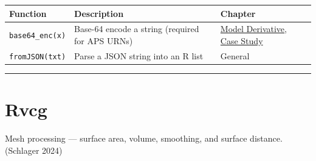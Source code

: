 \documentclass[
  11pt,
  letterpaper,
  DIV=11,
  numbers=noendperiod]{scrreprt}
\begin{document}
\begin{longtable}[]{@{}
  >{\raggedright\arraybackslash}p{}
  >{\raggedright\arraybackslash}p{}
  >{\raggedright\arraybackslash}p{}@{}}
\toprule\noalign{}
\begin{minipage}[b]{\linewidth}\raggedright
Function
\end{minipage} & \begin{minipage}[b]{\linewidth}\raggedright
Description
\end{minipage} & \begin{minipage}[b]{\linewidth}\raggedright
Chapter
\end{minipage} \\
\midrule\noalign{}
\endhead
\bottomrule\noalign{}
\endlastfoot
\texttt{base64\_enc(x)} & Base-64 encode a string (required for APS
URNs) & \hyperref[model-derivative]{Model Derivative},
\hyperref[case-study-dwg-to-shiny-dashboard]{Case Study} \\
\texttt{fromJSON(txt)} & Parse a JSON string into an R list & General \\
\end{longtable}

\begin{center}\rule{0.5\linewidth}{0.5pt}\end{center}

\section{Rvcg}\label{rvcg}

Mesh processing --- surface area, volume, smoothing, and surface
distance. (Schlager 2024)
\end{document}
